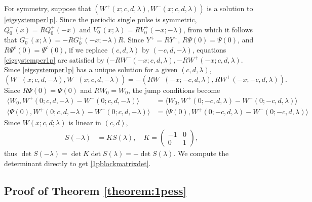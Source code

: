 \documentclass[10pt,reqno]{amsart}
\theoremstyle{plain}
\theoremstyle{definition}
\theoremstyle{remark}
\numberwithin{theorem}{section}
\numberwithin{equation}{section}
\begin{document}
For symmetry, suppose that $(W^+(x; c, d, \lambda), W^-(x; c, d, \lambda))$ is a solution to \cref{eigsystemper1p}. Since the periodic single pulse is symmetric, $Q_0^-(x) = R Q_0^+(-x)$ and $V_0^-(x; \lambda) = R V_0^+(-x; -\lambda)$, from which it follows that $G_0^-(x; \lambda) = -R G_0^+(-x; -\lambda)R$. Since $Y^+ = R Y^-$, $R \Psi(0) = \Psi(0)$, and $R \Psi^c(0) = \Psi^c(0)$, if we replace $(c, d, \lambda)$ by $(-c, d, -\lambda)$, equations \cref{eigsystemper1p} are satisfied by $(-RW^-(-x; c, d, \lambda), -RW^+(-x; c, d, \lambda)$. Since \cref{eigsystemper1p} has a unique solution for a given $(c, d, \lambda)$, 
\[
\left(W^+(x; c, d, -\lambda), W^-(x; c, d, -\lambda)\right)
= -\left(RW^-(-x; -c, d, \lambda), RW^+(-x; -c, d, \lambda)\right).
\]
Since $R \Psi(0) = \Psi(0)$ and $R W_0 = W_0$, the jump conditions become
\begin{align*}
\langle W_0, W^+(0; c, d, -\lambda) - W^-(0; c, d, -\lambda) \rangle &= \langle W_0, W^+(0; -c, d, \lambda) - W^-(0; -c, d, \lambda) \rangle \\
\langle \Psi(0), W^+(0; c, d, -\lambda) - W^-(0; c, d, -\lambda) \rangle &= \langle \Psi(0), W^+(0; -c, d, \lambda) - W^-(0; -c, d, \lambda) \rangle 
\end{align*}
Since $W(x; c, d; \lambda)$ is linear in $(c, d)$,
\begin{align*}
S(-\lambda) &= K S(\lambda), \quad K = \begin{pmatrix}-1 & 0 \\ 0 & 1 \end{pmatrix},
\end{align*}
thus $\det S(-\lambda) = \det K \det S(\lambda) = -\det S(\lambda)$. We compute the determinant directly to get \cref{1pblockmatrixdet}.

\subsection{Proof of Theorem \ref{theorem:1pess} }
\end{document}
